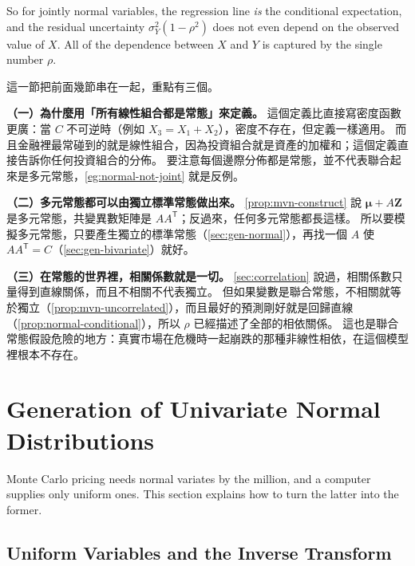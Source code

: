 So for jointly normal variables, the regression line \emph{is} the conditional expectation, and the residual uncertainty $\sigma_{Y}^{2}(1-\rho^{2})$ does not even depend on the observed value of $X$.
All of the dependence between $X$ and $Y$ is captured by the single number $\rho$.

\begin{remark}
	這一節把前面幾節串在一起，重點有三個。

	\textbf{（一）為什麼用「所有線性組合都是常態」來定義。}
	這個定義比直接寫密度函數更廣：當 $C$ 不可逆時（例如 $X_{3}=X_{1}+X_{2}$），密度不存在，但定義一樣適用。
	而且金融裡最常碰到的就是線性組合，因為投資組合就是資產的加權和；這個定義直接告訴你任何投資組合的分佈。
	要注意每個邊際分佈都是常態，並不代表聯合起來是多元常態，\autoref{eg:normal-not-joint} 就是反例。

	\textbf{（二）多元常態都可以由獨立標準常態做出來。}
	\autoref{prop:mvn-construct} 說 $\bm{\mu}+A\bm{Z}$ 是多元常態，共變異數矩陣是 $AA^{\mathsf{T}}$；反過來，任何多元常態都長這樣。
	所以要模擬多元常態，只要產生獨立的標準常態（\autoref{sec:gen-normal}），再找一個 $A$ 使 $AA^{\mathsf{T}}=C$（\autoref{sec:gen-bivariate}）就好。

	\textbf{（三）在常態的世界裡，相關係數就是一切。}
	\autoref{sec:correlation} 說過，相關係數只量得到直線關係，而且不相關不代表獨立。
	但如果變數是聯合常態，不相關就等於獨立（\autoref{prop:mvn-uncorrelated}），而且最好的預測剛好就是回歸直線（\autoref{prop:normal-conditional}），所以 $\rho$ 已經描述了全部的相依關係。
	這也是聯合常態假設危險的地方：真實市場在危機時一起崩跌的那種非線性相依，在這個模型裡根本不存在。
\end{remark}
\suppend

\section{Generation of Univariate Normal Distributions}
\label{sec:gen-normal}


\suppstart
Monte Carlo pricing needs normal variates by the million, and a computer supplies only uniform ones.
This section explains how to turn the latter into the former.

\subsection{Uniform Variables and the Inverse Transform}


